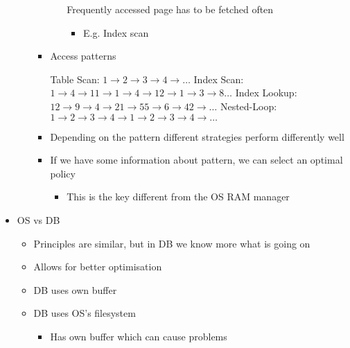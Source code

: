 \begin{itemize}
\begin{itemize}
\begin{itemize}
                        \begin{itemize}
                            \icon Frequently accessed page has to be fetched often
                                \begin{itemize}
                                    \item E.g. Index scan
                                \end{itemize}
                        \end{itemize}
                    \item Access patterns
                        \begin{itemize}
                             Table Scan: $1 \to 2 \to 3 \to 4 \to \dots$
                             Index Scan: $1 \to 4 \to 11 \to 1 \to 4 \to 12 \to 1 \to 3 \to 8 \dots$
                             Index Lookup: $12 \to 9 \to 4 \to 21 \to 55 \to 6 \to 42 \to \dots$
                             Nested-Loop: $1 \to 2 \to 3 \to 4 \to 1 \to 2 \to 3 \to 4 \to \dots$
                        \end{itemize}
                    \item Depending on the pattern different strategies perform differently well
                    \item If we have some information about pattern, we can select an optimal policy
                        \begin{itemize}
                            \item This is the key different from the OS RAM manager
                        \end{itemize}
                \end{itemize}
        \end{itemize}
    \item OS vs DB
        \begin{itemize}
            \item Principles are similar, but in DB we know more what is going on
            \item Allows for better optimisation
            \item DB uses own buffer
            \item DB uses OS's filesystem
                \begin{itemize}
                    \item Has own buffer which can cause problems
                \end{itemize}
        \end{itemize}
\end{itemize}

